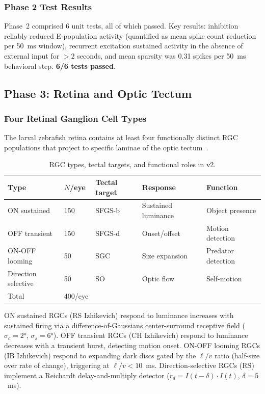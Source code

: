 \documentclass[11pt,a4paper]{article}
\begin{document}
\subsubsection{Phase 2 Test Results}

Phase~2 comprised 6 unit tests, all of which passed.
Key results: inhibition reliably reduced E-population activity
(quantified as mean spike count reduction per 50~ms window),
recurrent excitation sustained activity in the absence of external
input for $> 2$ seconds, and mean sparsity was 0.31 spikes per
50~ms behavioral step.
\textbf{6/6 tests passed}.

\subsection{Phase 3: Retina and Optic Tectum}\label{sec:phase3}

\subsubsection{Four Retinal Ganglion Cell Types}

The larval zebrafish retina contains at least four functionally
distinct RGC populations that project to specific laminae of the
optic tectum~\cite{robles2014,nikolaou2012}.

\begin{table}[H]
\centering
\caption{RGC types, tectal targets, and functional roles in v2.}
\label{tab:rgc}
\begin{tabular}{llllp{3cm}}
\toprule
Type & $N$/eye & Tectal target & Response & Function \\
\midrule
ON sustained      & 150 & SFGS-b & Sustained luminance & Object presence \\
OFF transient     & 150 & SFGS-d & Onset/offset        & Motion detection \\
ON-OFF looming    &  50 & SGC    & Size expansion      & Predator detection \\
Direction selective & 50 & SO  & Optic flow          & Self-motion \\
\midrule
Total & 400/eye & & & \\
\bottomrule
\end{tabular}
\end{table}

ON sustained RGCs (RS Izhikevich) respond to luminance increases with
sustained firing via a difference-of-Gaussians center-surround
receptive field ($\sigma_c = 2°$, $\sigma_s = 6°$).
OFF transient RGCs (CH Izhikevich) respond to luminance decreases with
a transient burst, detecting motion onset.
ON-OFF looming RGCs (IB Izhikevich) respond to expanding dark discs
gated by the $\ell/v$ ratio (half-size over rate of change), triggering
at $\ell/v < 10$~ms.
Direction-selective RGCs (RS) implement a Reichardt delay-and-multiply
detector ($r_d = I(t-\delta) \cdot I(t)$, $\delta = 5$~ms).
\end{document}
